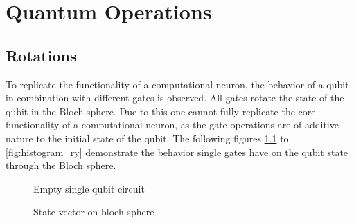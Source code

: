 
\chapter{Quantum Operations} %

\label{Chapter2}

\section{Rotations}
\label{chapter:rotation}

To replicate the functionality of a computational neuron, the behavior of a qubit in combination with different gates is observed. All gates rotate the state of the qubit in the Bloch sphere. Due to this one cannot fully replicate the core functionality of a computational neuron, as the gate operations are of additive nature to the initial state of the qubit. The following figures \ref{fig:circuit_empty} to \ref{fig:histogram_ry} demonstrate the behavior single gates have on the qubit state through the Bloch sphere.


\begin{figure}[!h]
    \centering
    \caption{Empty single qubit circuit}
    \label{fig:circuit_empty}
\end{figure}

\begin{figure}[!h]
    \centering
    \caption{State vector on bloch sphere}
    \label{fig:circuit_empty_bloch_sphere}
\end{figure}

